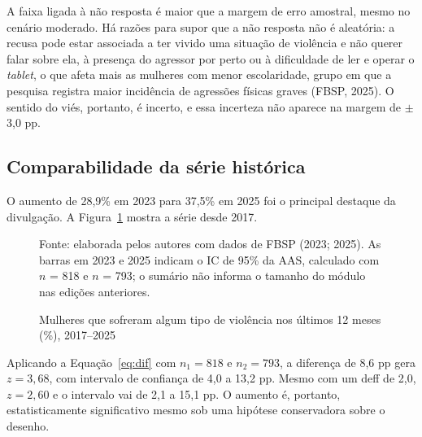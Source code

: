 \documentclass[12pt,a4paper]{article}
\newcommand{\fonte}[1]{%
  \vspace{-2mm}
  \begin{center}\footnotesize Fonte: #1\end{center}
}
\begin{document}
A faixa ligada à não resposta é maior que a margem de erro amostral, mesmo no cenário moderado. Há razões para supor que a não resposta não é aleatória: a recusa pode estar associada a ter vivido uma situação de violência e não querer falar sobre ela, à presença do agressor por perto ou à dificuldade de ler e operar o \textit{tablet}, o que afeta mais as mulheres com menor escolaridade, grupo em que a pesquisa registra maior incidência de agressões físicas graves (FBSP, 2025). O sentido do viés, portanto, é incerto, e essa incerteza não aparece na margem de $\pm$3,0 pp.

\subsection{Comparabilidade da série histórica}

O aumento de 28,9\% em 2023 para 37,5\% em 2025 foi o principal destaque da divulgação. A Figura~\ref{fig:serie} mostra a série desde 2017.

\begin{figure}[H]
\centering
\caption{Mulheres que sofreram algum tipo de violência nos últimos 12 meses (\%), 2017--2025}
\label{fig:serie}
\fonte{elaborada pelos autores com dados de FBSP (2023; 2025). As barras em 2023 e 2025 indicam o IC de 95\% da AAS, calculado com $n$ = 818 e $n$ = 793; o sumário não informa o tamanho do módulo nas edições anteriores.}
\end{figure}

Aplicando a Equação~\eqref{eq:dif} com $n_1 = 818$ e $n_2 = 793$, a diferença de 8,6 pp gera $z = 3{,}68$, com intervalo de confiança de 4,0 a 13,2 pp. Mesmo com um deff de 2,0, $z = 2{,}60$ e o intervalo vai de 2,1 a 15,1 pp. O aumento é, portanto, estatisticamente significativo mesmo sob uma hipótese conservadora sobre o desenho.
\end{document}
